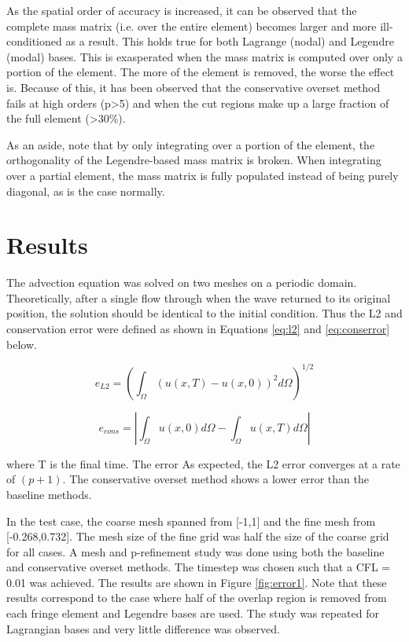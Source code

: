 \documentclass[11pt]{article}
\begin{document}
As the spatial order of accuracy is increased, it can be observed that the complete mass matrix
(i.e. over the entire element) becomes larger and more ill-conditioned as a result. This holds
true for both Lagrange (nodal) and Legendre (modal) bases. This is exasperated when 
the mass matrix is computed over only a portion of the element. The more of the element is removed,
the worse the effect is. Because of this, it has been observed that the conservative overset
method fails at high orders (p>5) and when the cut regions make up a large fraction of the
full element (>30\%).   

As an aside, note that by only integrating over a portion of the element, the orthogonality of the
Legendre-based mass matrix is broken. When integrating over a partial element, the mass
matrix is fully populated instead of being purely diagonal, as is the case normally. 

\section{Results}

The advection equation was solved on two meshes on a periodic domain. 
Theoretically, after a single flow through when the wave 
returned to its original position, the solution should 
be identical to the initial condition. Thus the L2 and conservation error were defined as 
shown in Equations \eqref{eq:l2} and \eqref{eq:conserror} below. 

\begin{equation}
e_{L2} = \left ( \int_\Omega (u(x,T) - u(x,0))^2 d\Omega \right )^{1/2}
\label{eq:l2}
\end{equation}

\begin{equation}
e_{cons} = \left | \int_\Omega u(x,0) d\Omega - \int_\Omega u(x,T) d\Omega \right |
\label{eq:conserror}
\end{equation}

\noindent where T is the final time.  The error 
As expected, the L2 error converges at a rate of $(p+1)$. The conservative overset method
shows a lower error than the baseline methods. 

In the test case, the coarse
mesh spanned from [-1,1] and the fine mesh from [-0.268,0.732]. The mesh size of the 
fine grid was half the size of the coarse grid for all cases. A mesh and p-refinement
study was done using both the baseline and conservative overset methods. The timestep
was chosen such that a CFL = 0.01 was achieved. The
results are shown in Figure \ref{fig:error1}. Note that 
these results correspond to the case where half of the overlap region is removed from
each fringe element and Legendre bases are used. The study was repeated for Lagrangian
bases and very little difference was observed.  
\end{document}
